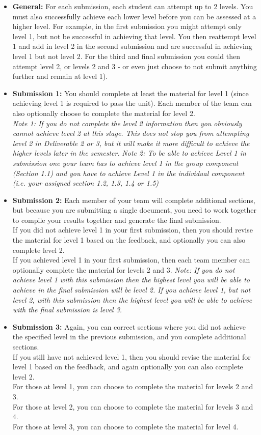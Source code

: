 \documentclass[a4paper, 11pt]{report}
\begin{document}
	\begin{itemize}
		\item \textbf{General:} For each submission, each student can attempt up to 2 levels. You must also successfully achieve each lower level before you can be assessed at a higher level. For example, in the first submission you might attempt only level 1, but not be successful in achieving that level. You then reattempt level 1 and add in level 2 in the second submission and are successful in achieving level 1 but not level 2. For the third and final submission you could then attempt level 2, or levels 2 and 3 - or even just choose to not submit anything further and remain at level 1).
		\item \textbf{Submission 1:} You should complete at least the material for level 1 (since achieving level 1 is required to pass the unit). Each member of the team can also optionally choose to complete the material for level 2.\\
		\textit{Note 1: If you do not complete the level 2 information then you obviously cannot achieve level 2 at this stage. This does not stop you from attempting level 2 in Deliverable 2 or 3, but it will make it more difficult to achieve the higher levels later in the semester.}
		\textit{Note 2: To be able to achieve Level 1 in submission one your team has to achieve level 1 in the group component (Section 1.1) and you have to achieve Level 1 in the individual component (i.e. your assigned section 1.2, 1.3, 1.4 or 1.5)}
		\item \textbf{Submission 2:} Each member of your team will complete additional sections, but because you are submitting a single document, you need to work together to compile your results together and generate the final submission.\\
		If you did not achieve level 1 in your first submission, then you should revise the material for level 1 based on the feedback, and optionally you can also complete level 2.\\
		If you achieved level 1 in your first submission, then each team member can optionally complete the material for levels 2 and 3.
		\textit{Note: If you do not achieve level 1 with this submission then the highest level you will be able to achieve in the final submission will be level 2. If you achieve level 1, but not level 2, with this submission then the highest level you will be able to achieve with the final submission is level 3.}
		\item \textbf{Submission 3:} Again, you can correct sections where you did not achieve the specified level in the previous submission, and you complete additional sections.\\
		If you still have not achieved level 1, then you should revise the material for level 1 based on the feedback, and again optionally you can also complete level 2.\\
		For those at level 1, you can choose to complete the material for levels 2 and 3.\\
		For those at level 2, you can choose to complete the material for levels 3 and 4.\\
		For those at level 3, you can choose to complete the material for level 4.
	\end{itemize}
	
\end{document}
